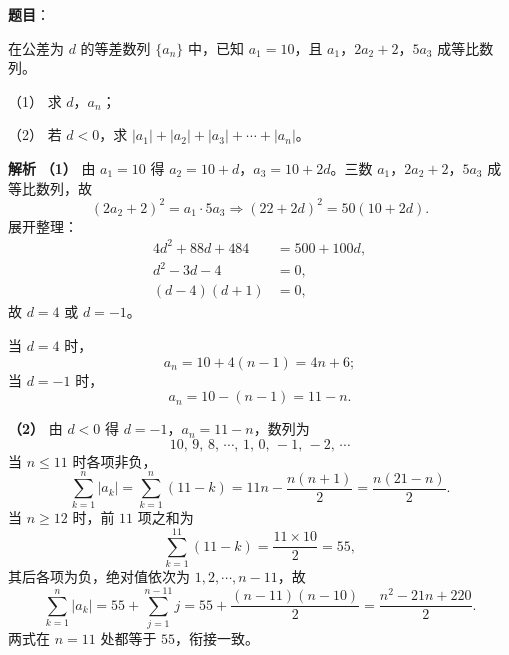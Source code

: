 \begin{answer}

\textbf{题目}：

在公差为 $d$ 的等差数列 $\{a_n\}$ 中，已知 $a_1=10$，且 $a_1$，$2a_2+2$，$5a_3$ 成等比数列。

（1） 求 $d$，$a_n$；

（2） 若 $d<0$，求 $|a_1|+|a_2|+|a_3|+\cdots+|a_n|$。

\textbf{解析}
\textbf{（1）} 由 $a_1=10$ 得 $a_2=10+d$，$a_3=10+2d$。三数 $a_1$，$2a_2+2$，$5a_3$ 成等比数列，故
\nopagebreak[4]
\[(2a_2+2)^2=a_1\cdot5a_3\Longrightarrow(22+2d)^2=50(10+2d).\]
展开整理：
\nopagebreak[4]
\[\begin{aligned}
4d^2+88d+484&=500+100d,\\
d^2-3d-4&=0,\\
(d-4)(d+1)&=0,
\end{aligned}\]
故 $d=4$ 或 $d=-1$。

当 $d=4$ 时，
\nopagebreak[4]
\[a_n=10+4(n-1)=4n+6;\]
当 $d=-1$ 时，
\nopagebreak[4]
\[a_n=10-(n-1)=11-n.\]

\textbf{（2）} 由 $d<0$ 得 $d=-1$，$a_n=11-n$，数列为
\nopagebreak[4]
\[10,\,9,\,8,\,\cdots,\,1,\,0,\,-1,\,-2,\,\cdots\]
当 $n\leqslant11$ 时各项非负，
\nopagebreak[4]
\[\sum_{k=1}^{n}|a_k|=\sum_{k=1}^{n}(11-k)=11n-\frac{n(n+1)}2=\frac{n(21-n)}2.\]
当 $n\geqslant12$ 时，前 $11$ 项之和为
\nopagebreak[4]
\[\sum_{k=1}^{11}(11-k)=\frac{11\times10}2=55,\]
其后各项为负，绝对值依次为 $1,2,\cdots,n-11$，故
\nopagebreak[4]
\[\sum_{k=1}^{n}|a_k|=55+\sum_{j=1}^{n-11}j
=55+\frac{(n-11)(n-10)}2
=\frac{n^2-21n+220}2.\]
两式在 $n=11$ 处都等于 $55$，衔接一致。



\end{answer}
